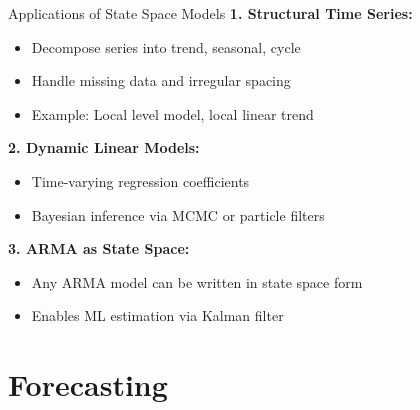\documentclass[aspectratio=169]{beamer}
\begin{document}
\begin{frame}{Applications of State Space Models}
  \textbf{1. Structural Time Series:}
  \begin{itemize}
    \item Decompose series into trend, seasonal, cycle
    \item Handle missing data and irregular spacing
    \item Example: Local level model, local linear trend
  \end{itemize}

  \vspace{0.5em}

  \textbf{2. Dynamic Linear Models:}
  \begin{itemize}
    \item Time-varying regression coefficients
    \item Bayesian inference via MCMC or particle filters
  \end{itemize}

  \vspace{0.5em}

  \textbf{3. ARMA as State Space:}
  \begin{itemize}
    \item Any ARMA model can be written in state space form
    \item Enables ML estimation via Kalman filter
  \end{itemize}
\end{frame}

\section{Forecasting}
\end{document}
